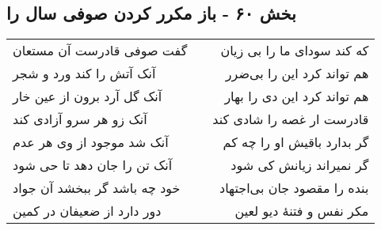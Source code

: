\begin{center}
\section*{بخش ۶۰ - باز مکرر کردن صوفی سال را}
\label{sec:sh060}
\begin{longtable}{l p{0.5cm} r}
گفت صوفی قادرست آن مستعان
&&
که کند سودای ما را بی زیان
\\
آنک آتش را کند ورد و شجر
&&
هم تواند کرد این را بی‌ضرر
\\
آنک گل آرد برون از عین خار
&&
هم تواند کرد این دی را بهار
\\
آنک زو هر سرو آزادی کند
&&
قادرست ار غصه را شادی کند
\\
آنک شد موجود از وی هر عدم
&&
گر بدارد باقیش او را چه کم
\\
آنک تن را جان دهد تا حی شود
&&
گر نمیراند زیانش کی شود
\\
خود چه باشد گر ببخشد آن جواد
&&
بنده را مقصود جان بی‌اجتهاد
\\
دور دارد از ضعیفان در کمین
&&
مکر نفس و فتنهٔ دیو لعین
\\
\end{longtable}
\end{center}
